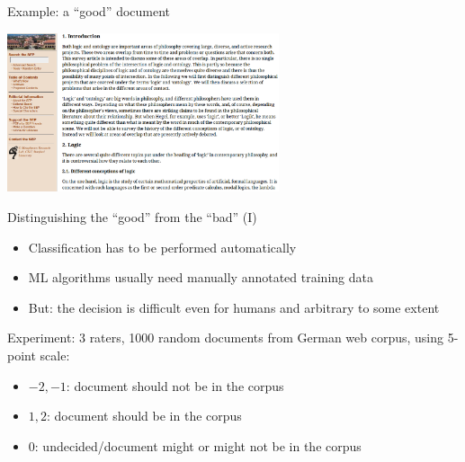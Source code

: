 \begin{frame}{Example: a ``good'' document}
  
  \begin{center}
     \includegraphics[width=8cm]{graphicswcc/good}
  \end{center}

\end{frame}



\begin{frame}
{Distinguishing the ``good'' from the ``bad'' (I)}  

\begin{itemize}
\item Classification has to be performed automatically
\item ML algorithms usually need manually annotated training data 
\item But: the decision is difficult even for humans and arbitrary to some extent
\end{itemize}
\pause

Experiment: 3 raters, 1000 random documents from German web corpus, using 5-point scale:

 \begin{itemize}
	\item $-2,-1$: document \alert{should not} be in the corpus 
	\item $1, 2$: document \alert{should} be in the corpus 
	\item $0$: undecided\slash document \alert{might or might not} be in the corpus
 \end{itemize}

 \end{frame}

